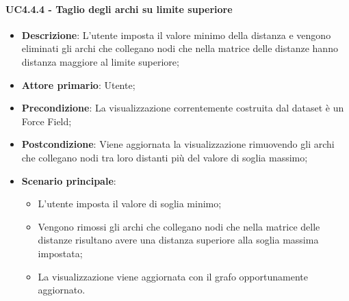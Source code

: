 \paragraph{UC4.4.4 - Taglio degli archi su limite superiore}
\label{par:uc4.4.4}
\begin{itemize}
    \item \textbf{Descrizione}:     L'utente imposta il valore minimo della distanza e vengono eliminati gli archi che collegano nodi che nella matrice delle distanze hanno distanza maggiore al limite superiore;
    \item \textbf{Attore primario}: Utente;
    \item \textbf{Precondizione}:   La visualizzazione correntemente costruita dal dataset è un Force Field;
    \item \textbf{Postcondizione}:  Viene aggiornata la visualizzazione rimuovendo gli archi  che collegano nodi tra loro distanti più del valore di soglia massimo;
    \item \textbf{Scenario principale}:
    \begin{itemize}
        \item L'utente imposta il valore di soglia minimo;
        \item Vengono rimossi gli archi che collegano nodi che nella matrice delle distanze risultano avere una distanza superiore alla soglia massima impostata;
        \item La visualizzazione viene aggiornata con il grafo opportunamente aggiornato.
    \end{itemize}
\end{itemize}

